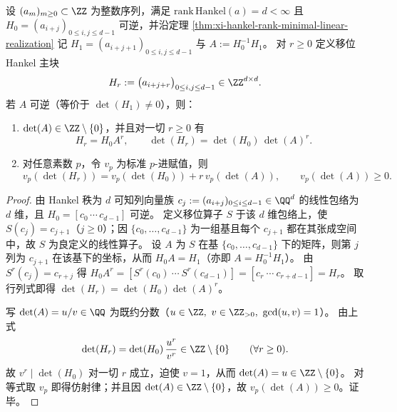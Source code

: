 \begin{theorem}\label{thm:xi-hankel-shift-det-integrality-padic-drift}
设 \((a_m)_{m\ge 0}\subset\ZZ\) 为整数序列，满足 \(\mathrm{rank}\,\mathrm{Hankel}(a)=d<\infty\) 且
\(
H_0=(a_{i+j})_{0\le i,j\le d-1}
\)
可逆，并沿定理 \ref{thm:xi-hankel-rank-minimal-linear-realization} 记
\(
H_1=(a_{i+j+1})_{0\le i,j\le d-1}
\)
与 \(A:=H_0^{-1}H_1\)。
对 \(r\ge 0\) 定义移位 Hankel 主块
\[
H_r:=\bigl(a_{i+j+r}\bigr)_{0\le i,j\le d-1}\in\ZZ^{d\times d}.
\]
若 \(A\) 可逆（等价于 \(\det(H_1)\neq 0\)），则：
\begin{enumerate}
  \item \(\det(A)\in\ZZ\setminus\{0\}\)，并且对一切 \(r\ge 0\) 有
  \[
  H_r=H_0A^{r},
  \qquad
  \det(H_r)=\det(H_0)\,\det(A)^{r}.
  \]
  \item 对任意素数 \(p\)，令 \(v_p\) 为标准 \(p\)-进赋值，则
  \[
  v_p(\det(H_r))=v_p(\det(H_0))+r\,v_p(\det(A)),
  \qquad
  v_p(\det(A))\ge 0.
  \]
\end{enumerate}
\end{theorem}
\begin{proof}
由 Hankel 秩为 \(d\) 可知列向量族 \(c_j:=(a_{i+j})_{0\le i\le d-1}\in\QQ^{d}\) 的线性包络为 \(d\) 维，且 \(H_0=[c_0\,\cdots\,c_{d-1}]\) 可逆。
定义移位算子 \(S\) 于该 \(d\) 维包络上，使 \(S(c_j)=c_{j+1}\)（\(j\ge 0\)）；因 \(\{c_0,\dots,c_{d-1}\}\) 为一组基且每个 \(c_{j+1}\) 都在其张成空间中，故 \(S\) 为良定义的线性算子。
设 \(A\) 为 \(S\) 在基 \(\{c_0,\dots,c_{d-1}\}\) 下的矩阵，则第 \(j\) 列为 \(c_{j+1}\) 在该基下的坐标，从而 \(H_0A=H_1\)（亦即 \(A=H_0^{-1}H_1\)）。
由 \(S^r(c_j)=c_{r+j}\) 得
\(
H_0A^{r}=[S^r(c_0)\ \cdots\ S^r(c_{d-1})]=[c_r\ \cdots\ c_{r+d-1}]=H_r
\)。
取行列式即得 \(\det(H_r)=\det(H_0)\det(A)^{r}\)。
\par
写 \(\det(A)=u/v\in\QQ\) 为既约分数（\(u\in\ZZ,\ v\in\ZZ_{>0},\ \gcd(u,v)=1\)）。
由上式
\[
\det(H_r)=\det(H_0)\,\frac{u^{r}}{v^{r}}\in\ZZ\setminus\{0\}\qquad(\forall r\ge 0).
\]
故 \(v^{r}\mid \det(H_0)\) 对一切 \(r\) 成立，迫使 \(v=1\)，从而 \(\det(A)=u\in\ZZ\setminus\{0\}\)。
对等式取 \(v_p\) 即得仿射律；并且因 \(\det(A)\in\ZZ\setminus\{0\}\)，故 \(v_p(\det(A))\ge 0\)。证毕。
\end{proof}

